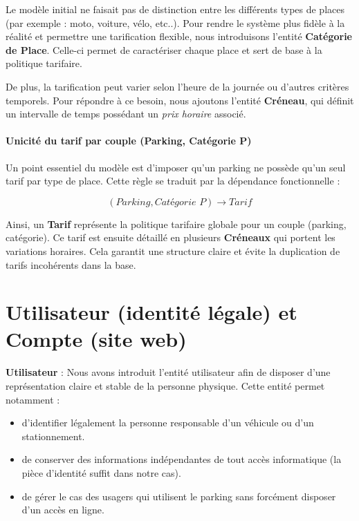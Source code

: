 \documentclass[a4paper,12pt]{report}
\begin{document}
Le modèle initial ne faisait pas de distinction entre les différents types de places 
(par exemple : moto, voiture, vélo, etc..). Pour rendre le système plus fidèle 
à la réalité et permettre une tarification flexible, nous introduisons l’entité 
\textbf{Catégorie de Place}. Celle-ci permet de caractériser chaque place et sert 
de base à la politique tarifaire.

De plus, la tarification peut varier selon l’heure de la journée ou d’autres critères 
temporels. Pour répondre à ce besoin, nous ajoutons l’entité \textbf{Créneau}, qui 
définit un intervalle de temps possédant un \emph{prix horaire} associé.

\paragraph{Unicité du tarif par couple (Parking, Catégorie P)}
Un point essentiel du modèle est d’imposer qu’un parking ne possède qu’un seul tarif 
par type de place. Cette règle se traduit par la dépendance fonctionnelle :

\[
(\textit{Parking}, \textit{Catégorie P}) \rightarrow \textit{Tarif}
\]

Ainsi, un \textbf{Tarif} représente la politique tarifaire globale pour un couple 
(parking, catégorie). Ce tarif est ensuite détaillé en plusieurs \textbf{Créneaux} 
qui portent les variations horaires. Cela garantit une structure claire et évite 
la duplication de tarifs incohérents dans la base.


\section{Utilisateur (identité légale) et Compte (site web)}
\label{subsec:utilisateur-compte}
\noindent \textbf{Utilisateur} : Nous avons introduit l’entité utilisateur  afin de disposer d’une représentation 
claire et stable de la personne physique. Cette entité permet notamment :
\begin{itemize}
    \item d’identifier légalement la personne responsable d’un véhicule ou d’un stationnement.
    \item de conserver des informations indépendantes de tout accès informatique (la pièce d’identité suffit dans notre cas).
    \item de gérer le cas des usagers qui utilisent le parking sans forcément disposer d’un accès en ligne.
\end{itemize}
\end{document}
